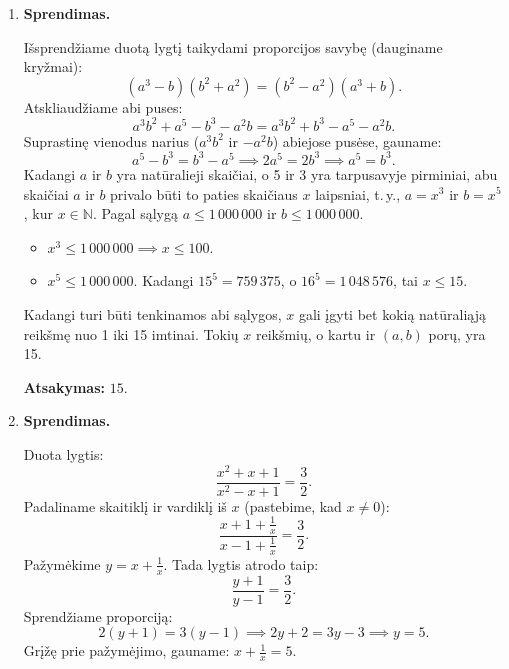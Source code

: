 \documentclass[11pt,a4paper]{article}
\begin{document}
\begin{enumerate}
\begin{center}
    \end{center}
    
    Nagrinėjame statųjį trikampį, kurio horizontalus statinis lygus atstumui tarp projekcijų (10), o vertikalus statinis lygus $5 - (-3) = 8$. Pagal Pitagoro teoremą atkarpos $A'B$ ilgis:
    \[ A'B = \sqrt{10^2 + 8^2} = \sqrt{100 + 64} = \sqrt{164} = 2\sqrt{41}. \]
    
    \textbf{Atsakymas:} $2\sqrt{41}$.

    \vspace{0.3cm}
    \item \textbf{Sprendimas.}
    
    Išsprendžiame duotą lygtį taikydami proporcijos savybę (dauginame kryžmai):
    \[ (a^3 - b)(b^2 + a^2) = (b^2 - a^2)(a^3 + b). \]
    Atskliaudžiame abi puses:
    \[ a^3b^2 + a^5 - b^3 - a^2b = a^3b^2 + b^3 - a^5 - a^2b. \]
    Suprastinę vienodus narius ($a^3b^2$ ir $-a^2b$) abiejose pusėse, gauname:
    \[ a^5 - b^3 = b^3 - a^5 \implies 2a^5 = 2b^3 \implies a^5 = b^3. \]
    Kadangi $a$ ir $b$ yra natūralieji skaičiai, o 5 ir 3 yra tarpusavyje pirminiai, abu skaičiai $a$ ir $b$ privalo būti to paties skaičiaus $x$ laipsniai, t.\,y., $a = x^3$ ir $b = x^5$, kur $x \in \mathbb{N}$.
    Pagal sąlygą $a \le 1\,000\,000$ ir $b \le 1\,000\,000$.
    \begin{itemize}
        \item $x^3 \le 1\,000\,000 \implies x \le 100$.
        \item $x^5 \le 1\,000\,000$. Kadangi $15^5 = 759\,375$, o $16^5 = 1\,048\,576$, tai $x \le 15$.
    \end{itemize}
    Kadangi turi būti tenkinamos abi sąlygos, $x$ gali įgyti bet kokią natūraliąją reikšmę nuo 1 iki 15 imtinai. Tokių $x$ reikšmių, o kartu ir $(a, b)$ porų, yra 15.
    
    \textbf{Atsakymas:} $15$.

    \vspace{0.3cm}
    \item \textbf{Sprendimas.}
    
    Duota lygtis:
    \[ \frac{x^2 + x + 1}{x^2 - x + 1} = \frac{3}{2}. \]
    Padaliname skaitiklį ir vardiklį iš $x$ (pastebime, kad $x \neq 0$):
    \[ \frac{x + 1 + \frac{1}{x}}{x - 1 + \frac{1}{x}} = \frac{3}{2}. \]
    Pažymėkime $y = x + \frac{1}{x}$. Tada lygtis atrodo taip:
    \[ \frac{y + 1}{y - 1} = \frac{3}{2}. \]
    Sprendžiame proporciją:
    \[ 2(y + 1) = 3(y - 1) \implies 2y + 2 = 3y - 3 \implies y = 5. \]
    Grįžę prie pažymėjimo, gauname: $x + \frac{1}{x} = 5$.
    

\end{enumerate}
\end{document}
